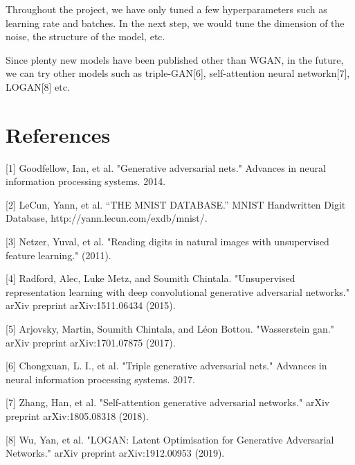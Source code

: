 \documentclass{article}
\begin{document}
Throughout the project, we have only tuned a few hyperparameters such as learning rate and batches. In the next step, we would tune the dimension of the noise, the structure of the model, etc.

Since plenty new models have been published other than WGAN, in the future, we can try other models such as triple-GAN[6], self-attention neural networkn[7], LOGAN[8] etc.

\section*{References}

[1] Goodfellow, Ian, et al. "Generative adversarial nets." Advances in neural information processing systems. 2014.

[2] LeCun, Yann, et al. “THE MNIST DATABASE.” MNIST Handwritten Digit Database, http://yann.lecun.com/exdb/mnist/.

[3] Netzer, Yuval, et al. "Reading digits in natural images with unsupervised feature learning." (2011).

[4] Radford, Alec, Luke Metz, and Soumith Chintala. "Unsupervised representation learning with deep convolutional generative adversarial networks." arXiv preprint arXiv:1511.06434 (2015).

[5] Arjovsky, Martin, Soumith Chintala, and Léon Bottou. "Wasserstein gan." arXiv preprint arXiv:1701.07875 (2017).

[6] Chongxuan, L. I., et al. "Triple generative adversarial nets." Advances in neural information processing systems. 2017.

[7] Zhang, Han, et al. "Self-attention generative adversarial networks." arXiv preprint arXiv:1805.08318 (2018).

[8] Wu, Yan, et al. "LOGAN: Latent Optimisation for Generative Adversarial Networks." arXiv preprint arXiv:1912.00953 (2019).
\end{document}
